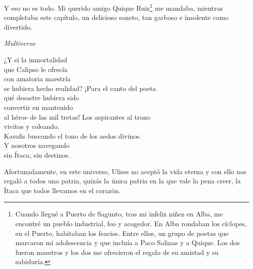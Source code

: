 Y eso no es todo. Mi querido amigo Quique Ruiz\footnote{Cuando llegué a Puerto de Sagunto, tras mi infeliz niñez en Alba, me encontré un pueblo industrial, feo y acogedor. En Alba rondaban los cíclopes, en el Puerto, habitaban los feacios. Entre ellos, un grupo de poetas que marcaron mi adolescencia y que incluía a Paco Salinas y a Quique. Los dos fueron maestros y los dos me ofrecieron el regalo de su amistad y su sabiduría.} me mandaba, mientras completaba este capítulo, un delicioso soneto, tan garboso e insolente como divertido.

\emph{Multiverso}

\begin{versocita}
¿Y si la inmortalidad\\
que Calipso le ofrecía\\
con amatoria maestría\\
se hubiera hecho realidad?
\stanzabreak
¡Para el canto del poeta\\
qué desastre hubiera sido\\
convertir en mantenido\\
al héroe de las mil tretas!
\stanzabreak
Los aspirantes al trono\\
vivitos y coleando.\\
Kavafis buscando el tono
\stanzabreak
de los aedos divinos.\\
Y nosotros navegando\\
sin Ítaca, sin destinos.
\end{versocita}

Afortunadamente, en este universo, Ulises no aceptó la vida eterna y con ello nos regaló a todos una patria, quizás la única patria en la que vale la pena creer, la Ítaca que todos llevamos en el corazón.

%

